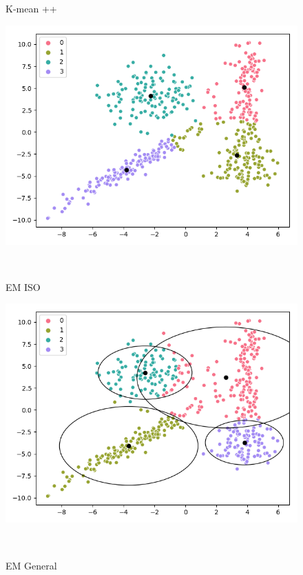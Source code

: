 \documentclass[a4paper]{article}
\begin{document}
\begin{figure}[h]
\centering
\begin{minipage}{0,35\textwidth}
\caption{K-mean ++}
\includegraphics[scale=.35]{kmean.png}
\end{minipage}
\\
\begin{minipage}{0,35\textwidth}
\caption{EM ISO}
\includegraphics[scale=.35]{em_iso.png}
\end{minipage}
\\
\begin{minipage}{0,35\textwidth}
\caption{EM General}

\end{minipage}
\end{figure}
\end{document}
